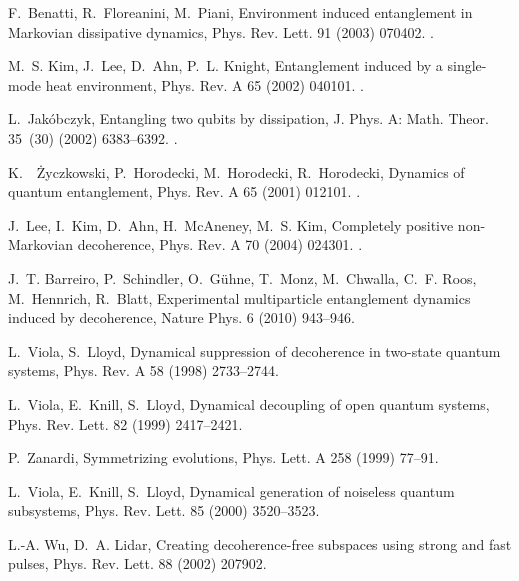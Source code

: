 \documentclass[3p,sort&compress]{elsarticle}
\begin{document}
\begin{thebibliography}{100}
F.~Benatti, R.~Floreanini, M.~Piani, Environment induced entanglement in
  {M}arkovian dissipative dynamics, Phys. Rev. Lett. 91 (2003) 070402.
\newblock \href {http://dx.doi.org/10.1103/PhysRevLett.91.070402}
  {}.

M.~S. Kim, J.~Lee, D.~Ahn, P.~L. Knight, Entanglement induced by a single-mode
  heat environment, Phys. Rev. A 65 (2002) 040101.
\newblock \href {http://dx.doi.org/10.1103/PhysRevA.65.040101}
  {}.

L.~Jak{\'o}bczyk, Entangling two qubits by
  dissipation, J. Phys. A: Math. Theor. 35~(30) (2002) 6383--6392.
\newblock \href {http://dx.doi.org/10.1088/0305-4470/35/30/313}
  {}.

K.~\ifmmode~\else \.{Z}\fi{}yczkowski, P.~Horodecki, M.~Horodecki,
  R.~Horodecki, Dynamics of quantum entanglement, Phys. Rev. A 65 (2001)
  012101.
\newblock \href {http://dx.doi.org/10.1103/PhysRevA.65.012101}
  {}.

J.~Lee, I.~Kim, D.~Ahn, H.~McAneney, M.~S. Kim, Completely positive
  non-{M}arkovian decoherence, Phys. Rev. A 70 (2004) 024301.
\newblock \href {http://dx.doi.org/10.1103/PhysRevA.70.024301}
  {}.

J.~T. Barreiro, P.~Schindler, O.~G{\"u}hne, T.~Monz, M.~Chwalla, C.~F. Roos,
  M.~Hennrich, R.~Blatt, Experimental multiparticle entanglement dynamics
  induced by decoherence, Nature Phys. 6 (2010) 943--946.

L.~Viola, S.~Lloyd, Dynamical suppression of decoherence in two-state quantum
  systems, Phys. Rev. A 58 (1998) 2733--2744.

L.~Viola, E.~Knill, S.~Lloyd, Dynamical decoupling of open quantum systems,
  Phys. Rev. Lett. 82 (1999) 2417--2421.

P.~Zanardi, Symmetrizing evolutions, Phys. Lett. A 258 (1999) 77--91.

L.~Viola, E.~Knill, S.~Lloyd, Dynamical generation of noiseless quantum
  subsystems, Phys. Rev. Lett. 85 (2000) 3520--3523.

L.-A. Wu, D.~A. Lidar, Creating decoherence-free subspaces using strong and
  fast pulses, Phys. Rev. Lett. 88 (2002) 207902.


\end{thebibliography}
\end{document}
